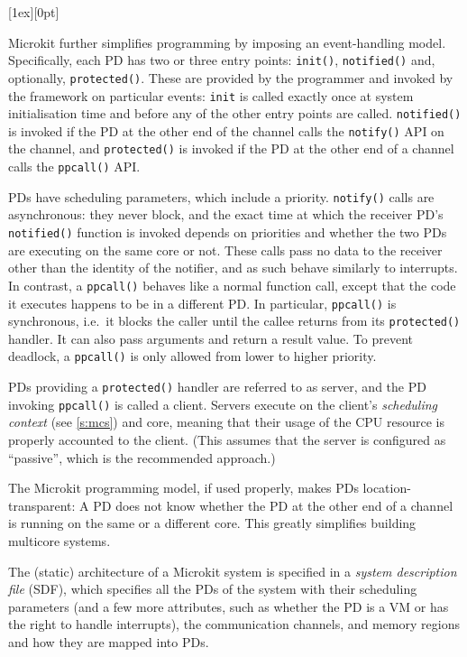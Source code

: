 \documentclass[english,a4paper,12pt]{report}
\newcommand{\code}[1]{\texttt{#1}}
\newlength{\chillilng}\setlength{\chillilng}{8mm}
\newlength{\chillimarg}\setlength{\chillimarg}{10mm}
\newcommand{\chilli}{\texttt{[image: chilli]}}
\newcommand{\chilliItem}{\raisebox{-5mm}[1ex][0pt]{%
      \makebox[\chillilng][r]{\chilli}}}
\newenvironment{Chilli}{
    \begin{list}{}{
      \setlength{\labelwidth}{\chillilng}
      \setlength{\leftmargin}{\chillimarg}}
    \item[\chilliItem]
    }
  {\end{list}}
\begin{document}
  \begin{Chilli}
    Microkit further simplifies programming by imposing an
    event-handling model. Specifically, each PD has two or three entry
    points: \code{init()}, \code{notified()} and, optionally,
    \code{protected()}. These are provided by the programmer and invoked
    by the framework on particular events: \code{init} is called exactly
    once at system initialisation time and before any of the other
    entry points are called. \code{notified()} is invoked if the PD at the
    other end of the channel calls the \code{notify()} API on the
    channel, and \code{protected()} is invoked if the PD at the other
    end of a channel calls the \code{ppcall()} API.

    PDs have scheduling parameters, which include a priority.
    \code{notify()} calls are asynchronous: they never block, and the
    exact time at which the receiver PD's \code{notified()} function is invoked depends
    on priorities and whether the two PDs are executing on the same core
    or not. These calls pass no data to the receiver other than the
    identity of the notifier, and as such behave similarly to
    interrupts. In contrast, a \code{ppcall()} behaves like a normal
    function call, except that the code it executes happens to be in a
    different PD. In particular, \code{ppcall()} is synchronous, i.e.\ it blocks
    the caller until the callee returns from its \code{protected()}
    handler.  It can also pass arguments and return a
    result value. To prevent deadlock,  a \code{ppcall()} is only
    allowed from lower to higher priority.

    PDs providing a \code{protected()} handler are referred to as
    server, and the PD invoking \code{ppcall()} is called a
    client. Servers execute on the client's \emph{scheduling context}
    (see \autoref{s:mcs}) and core, meaning that their usage of the CPU
    resource is properly accounted to the client. (This assumes that
    the server is configured as ``passive'', which is the recommended
    approach.)

    The Microkit programming model, if used properly, makes PDs
    location-transparent: A PD does not know whether the PD at the
    other end of a channel is running on the same or a different
    core. This greatly simplifies building multicore systems.
  \end{Chilli}

  The (static) architecture of a Microkit system is specified in a
  \emph{system description file} (SDF), which specifies all the PDs of
  the system with their scheduling parameters (and a few more
  attributes, such as whether the PD is a VM or has the right to
  handle interrupts), the communication channels, and memory regions
  and how they are mapped into PDs.
\end{document}
